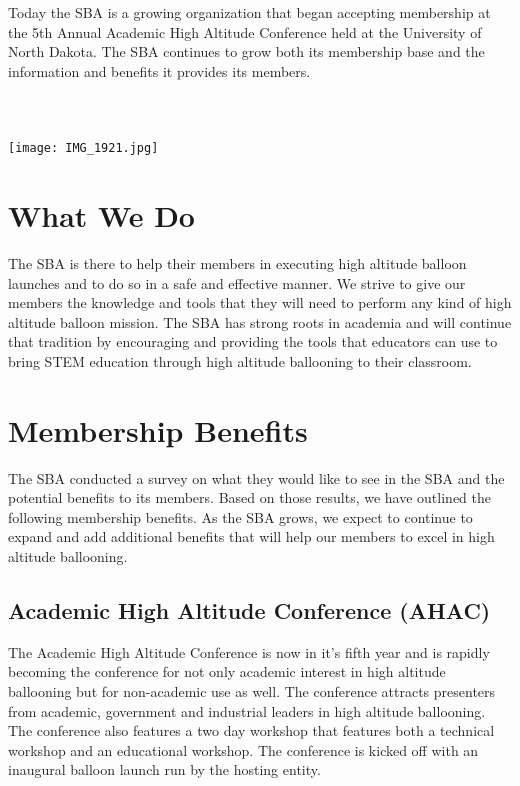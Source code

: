 \documentclass[10pt,foldmark,notumble]{leaflet}
\begin{document}
Today the SBA is a growing organization that began accepting membership at the 5th Annual Academic High Altitude Conference held at the University of North Dakota. The SBA continues to grow both its membership base and the information and benefits it provides its members. 
\ \\ \ \\ \ \\ \ \\
\texttt{[image: IMG\_1921.jpg]}

\section{What We Do}

The SBA is there to help their members in executing high altitude balloon launches and to do so in a safe and effective manner.  We strive to give our members the knowledge and tools that they will need to perform any kind of high altitude balloon mission.  The SBA has strong roots in academia and will continue that tradition by encouraging and providing the tools that educators can use to bring STEM education through high altitude ballooning to their classroom.

\section{Membership Benefits}
The SBA conducted a survey on what they would like to see in the SBA and the potential benefits to its members.  Based on those results, we have outlined the following membership benefits.  As the SBA grows, we expect to continue to expand and add additional benefits that will help our members to excel in high altitude ballooning.

\subsection{Academic High Altitude Conference (AHAC)}
The Academic High Altitude Conference is now in it's fifth year and is rapidly becoming the conference for not only academic interest in high altitude ballooning but for non-academic use as well.  The conference attracts presenters from academic, government and industrial leaders in high altitude ballooning.  The conference also features a two day workshop that features both a technical workshop and an educational workshop.  The conference is kicked off with an inaugural balloon launch run by the hosting entity.
\end{document}
